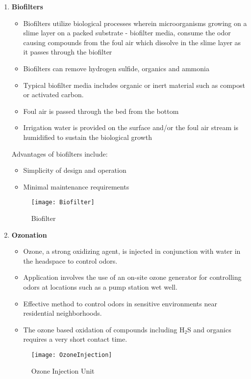 \begin{enumerate}
\begin{figure}[htp]
	\end{figure}
\newpage	
\item \textbf{Biofilters}
\begin{itemize}
\item Biofilters utilize biological processes wherein microorganisms growing on a slime layer on a packed substrate - biofilter media, consume the odor causing compounds from the foul air which dissolve in the slime layer as it passes through the biofilter
\item Biofilters can remove hydrogen sulfide, organics and ammonia
\item Typical biofilter media includes organic or inert material such as compost or activated carbon.
\item Foul air is passed through the bed from the bottom
\item Irrigation water is provided on the surface and/or the foul air stream is humidified to sustain the biological growth
\end{itemize}
Advantages of biofilters include:
\begin{itemize}
\item Simplicity of design and operation
\item Minimal maintenance requirements
\end{itemize}


\begin{figure}
	\begin{center}
		\texttt{[image: Biofilter]}
			\caption{Biofilter}
	\end{center}
	
	\end{figure}
\newpage	
\item \textbf{Ozonation}
\begin{itemize}
\item Ozone, a strong oxidizing agent, is injected in conjunction with water in the headspace to control odors.
\item Application involves the use of an on-site ozone generator for controlling odors at locations such as a pump station wet well.
\item Effective method to control odors in sensitive environments near residential neighborhoods.
\item The ozone based oxidation of compounds including H$_2$S and organics requires a very short contact time.
\end{itemize}

\begin{figure}[!htp]
	\begin{center}
		\texttt{[image: OzoneInjection]}
			\caption{Ozone Injection Unit}
	\end{center}
	
	\end{figure}

\end{enumerate}


\clearpage












